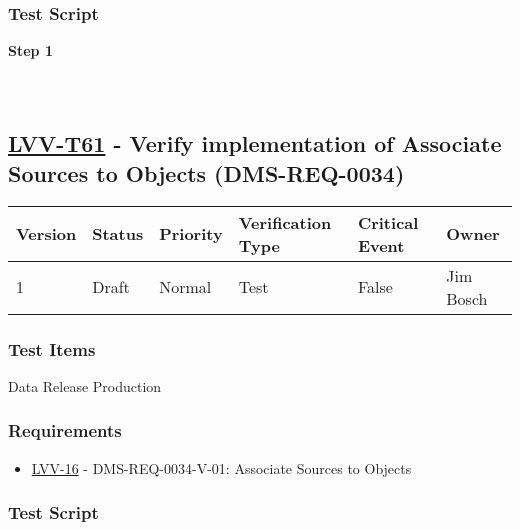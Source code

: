\hypertarget{test-script-37}{%
\subsubsection{Test Script}\label{test-script-37}}

\textbf{Step 1}\\
~\\
~\\

\hypertarget{lvv-t61---verify-implementation-of-associate-sources-to-objects-dms-req-0034}{%
\subsection{\texorpdfstring{\href{https://jira.lsstcorp.org/secure/Tests.jspa\#/testCase/LVV-T61}{LVV-T61}
- Verify implementation of Associate Sources to Objects
(DMS-REQ-0034)}{LVV-T61 - Verify implementation of Associate Sources to Objects (DMS-REQ-0034)}}\label{lvv-t61---verify-implementation-of-associate-sources-to-objects-dms-req-0034}}

\begin{longtable}[]{@{}llllll@{}}
\toprule
Version & Status & Priority & Verification Type & Critical Event &
Owner\tabularnewline
\midrule
\endhead
1 & Draft & Normal & Test & False & Jim Bosch\tabularnewline
\bottomrule
\end{longtable}

\hypertarget{test-items-37}{%
\subsubsection{Test Items}\label{test-items-37}}

Data Release Production~

\hypertarget{requirements-38}{%
\subsubsection{Requirements}\label{requirements-38}}

\begin{itemize}
\tightlist
\item
  \href{https://jira.lsstcorp.org/browse/LVV-16}{LVV-16} -
  DMS-REQ-0034-V-01: Associate Sources to Objects
\end{itemize}

\hypertarget{test-script-38}{%
\subsubsection{Test Script}\label{test-script-38}}

